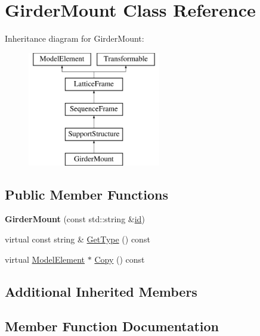 \hypertarget{classGirderMount}{}\section{Girder\+Mount Class Reference}
\label{classGirderMount}
Inheritance diagram for Girder\+Mount\+:\begin{figure}[H]
\begin{center}
\leavevmode
\includegraphics[height=5.000000cm]{classGirderMount}
\end{center}
\end{figure}
\subsection*{Public Member Functions}
\begin{DoxyCompactItemize}
\item 
\mbox{\label{classGirderMount_ad8837e8defdc07b2ff2120eb25ca8207}} 
{\bfseries Girder\+Mount} (const std\+::string \&\hyperlink{classModelElement_aada171ead2085c75b592cf07d91bc5c2}{id})
\item 
virtual const string \& \hyperlink{classGirderMount_af23acf9dc5a5aa1bf3eb246fd6fcbca1}{Get\+Type} () const
\item 
virtual \hyperlink{classModelElement}{Model\+Element} $\ast$ \hyperlink{classGirderMount_aa33c58a633237a7a54faa73ba73b4185}{Copy} () const
\end{DoxyCompactItemize}
\subsection*{Additional Inherited Members}


\subsection{Member Function Documentation}
\mbox{\label{classGirderMount_aa33c58a633237a7a54faa73ba73b4185}} 
